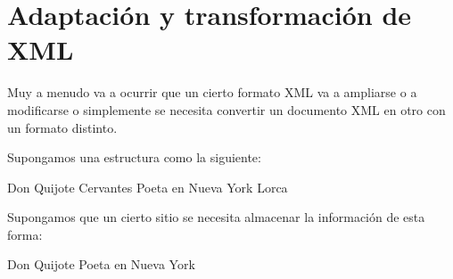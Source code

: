 \documentclass[letterpaper,10pt,spanish]{sphinxmanual}
\begin{document}
\section{Adaptación y transformación de XML}
\label{\detokenize{tema7:adaptacion-y-transformacion-de-xml}}
Muy a menudo va a ocurrir que un cierto formato XML va a ampliarse o a modificarse o simplemente se necesita convertir un documento XML en otro con un formato distinto.

Supongamos una estructura como la siguiente:

\begin{sphinxVerbatim}[commandchars=\\\{\}]
                Don Quijote
                Cervantes
                Poeta en Nueva York
                Lorca
\end{sphinxVerbatim}

Supongamos que un cierto sitio se necesita almacenar la información de esta forma:

\begin{sphinxVerbatim}[commandchars=\\\{\}]
                 Don Quijote
                 
                Poeta en Nueva York
\end{sphinxVerbatim}
\end{document}
